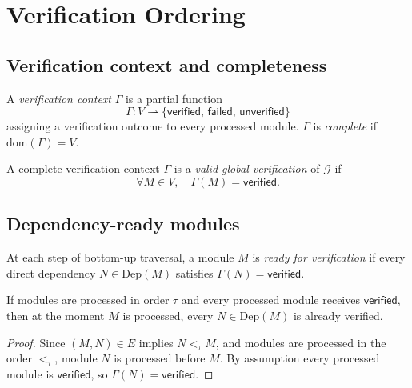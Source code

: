 \documentclass[11pt]{article}
\newcommand{\IG}{\mathcal{G}}              %
\newcommand{\Dep}{\mathrm{Dep}}            %
\newcommand{\TopoOrd}{\tau}                %
\newcommand{\VerifCtx}{\Gamma}             %
\begin{document}
\section{Verification Ordering}
\label{sec:ordering}

\subsection{Verification context and completeness}

\begin{definition}
\label{def:verif-context}
A \emph{verification context} $\VerifCtx$ is a partial function
\[
  \VerifCtx \colon V \rightharpoonup
  \{\mathsf{verified},\, \mathsf{failed},\, \mathsf{unverified}\}
\]
assigning a verification outcome to every processed module.
$\VerifCtx$ is \emph{complete} if $\mathrm{dom}(\VerifCtx) = V$.
\end{definition}

\begin{definition}
\label{def:valid-global}
A complete verification context $\VerifCtx$ is a
\emph{valid global verification} of $\IG$ if
\[
  \forall M \in V,\quad \VerifCtx(M) = \mathsf{verified}.
\]
\end{definition}

\subsection{Dependency-ready modules}

At each step of bottom-up traversal, a module $M$ is
\emph{ready for verification} if every direct dependency
$N \in \Dep(M)$ satisfies $\VerifCtx(N) = \mathsf{verified}$.

\begin{lemma}
\label{lem:readiness}
If modules are processed in order $\TopoOrd$ and every processed
module receives $\mathsf{verified}$, then at the moment $M$ is
processed, every $N \in \Dep(M)$ is already verified.
\end{lemma}

\begin{proof}
Since $(M, N) \in E$ implies $N <_{\TopoOrd} M$, and modules are
processed in the order $<_{\TopoOrd}$, module $N$ is processed before
$M$.  By assumption every processed module is $\mathsf{verified}$,
so $\VerifCtx(N) = \mathsf{verified}$.
\end{proof}
\end{document}
